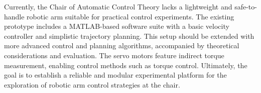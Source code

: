 Currently, the Chair of Automatic Control Theory lacks a lightweight and safe-to-handle robotic arm suitable for practical control experiments.
The existing prototype includes a MATLAB-based software suite with a basic velocity controller and simplistic trajectory planning.
This setup should be extended with more advanced control and planning algorithms, accompanied by theoretical considerations and evaluation.
The servo motors feature indirect torque measurement, enabling control methods such as torque control.
Ultimately, the goal is to establish a reliable and modular experimental platform for the exploration of robotic arm control strategies at the chair.
